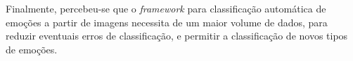 Finalmente, percebeu-se que o \textit{framework} para classificação automática de emoções a partir de imagens necessita de um maior volume de dados, para reduzir eventuais erros de classificação, e permitir a classificação de novos tipos de emoções.

